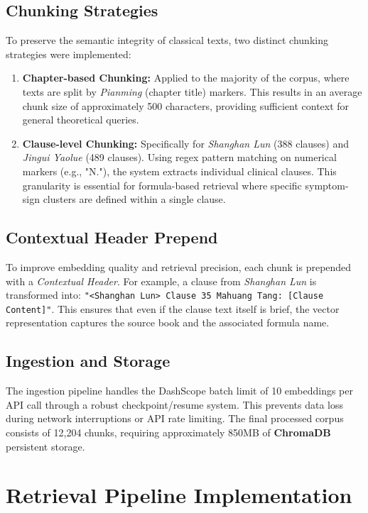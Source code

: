 \subsection{Chunking Strategies}
To preserve the semantic integrity of classical texts, two distinct chunking strategies were implemented:
\begin{enumerate}
    \item \textbf{Chapter-based Chunking:} Applied to the majority of the corpus, where texts are split by \textit{Pianming} (chapter title) markers. This results in an average chunk size of approximately 500 characters, providing sufficient context for general theoretical queries.
    \item \textbf{Clause-level Chunking:} Specifically for \textit{Shanghan Lun} (388 clauses) and \textit{Jingui Yaolue} (489 clauses). Using regex pattern matching on numerical markers (e.g., "N."), the system extracts individual clinical clauses. This granularity is essential for formula-based retrieval where specific symptom-sign clusters are defined within a single clause.
\end{enumerate}

\subsection{Contextual Header Prepend}
To improve embedding quality and retrieval precision, each chunk is prepended with a \textit{Contextual Header}. For example, a clause from \textit{Shanghan Lun} is transformed into: \texttt{"<Shanghan Lun> Clause 35 Mahuang Tang: [Clause Content]"}. This ensures that even if the clause text itself is brief, the vector representation captures the source book and the associated formula name.

\subsection{Ingestion and Storage}
The ingestion pipeline handles the DashScope batch limit of 10 embeddings per API call through a robust checkpoint/resume system. This prevents data loss during network interruptions or API rate limiting. The final processed corpus consists of 12,204 chunks, requiring approximately 850MB of \textbf{ChromaDB} persistent storage.

\section{Retrieval Pipeline Implementation}

